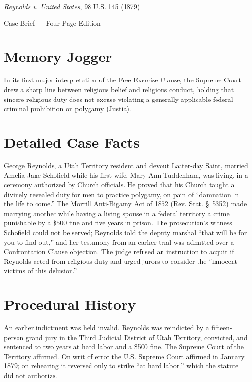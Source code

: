 \documentclass[12pt]{article}
\begin{document}
\begin{center}
{\LARGE \textit{Reynolds v. United States}, 98 U.S. 145 (1879)\par}
\vspace{0.8em}
{\large Case Brief --- Four-Page Edition\par}
\end{center}
\vspace{1em}

\section{Memory Jogger}

In its first major interpretation of the Free Exercise Clause, the Supreme Court drew a sharp line between religious belief and religious conduct, holding that sincere religious duty does not excuse violating a generally applicable federal criminal prohibition on polygamy (\href{https://supreme.justia.com/cases/federal/us/98/145/}{Justia}).

\section{Detailed Case Facts}

George Reynolds, a Utah Territory resident and devout Latter-day Saint, married Amelia Jane Schofield while his first wife, Mary Ann Tuddenham, was living, in a ceremony authorized by Church officials. He proved that his Church taught a divinely revealed duty for men to practice polygamy, on pain of ``damnation in the life to come.'' The Morrill Anti-Bigamy Act of 1862 (Rev. Stat. \S~5352) made marrying another while having a living spouse in a federal territory a crime punishable by a \$500 fine and five years in prison. The prosecution's witness Schofield could not be served; Reynolds told the deputy marshal ``that will be for you to find out,'' and her testimony from an earlier trial was admitted over a Confrontation Clause objection. The judge refused an instruction to acquit if Reynolds acted from religious duty and urged jurors to consider the ``innocent victims of this delusion.''

\section{Procedural History}

An earlier indictment was held invalid. Reynolds was reindicted by a fifteen-person grand jury in the Third Judicial District of Utah Territory, convicted, and sentenced to two years at hard labor and a \$500 fine. The Supreme Court of the Territory affirmed. On writ of error the U.S. Supreme Court affirmed in January 1879; on rehearing it reversed only to strike ``at hard labor,'' which the statute did not authorize.
\end{document}
